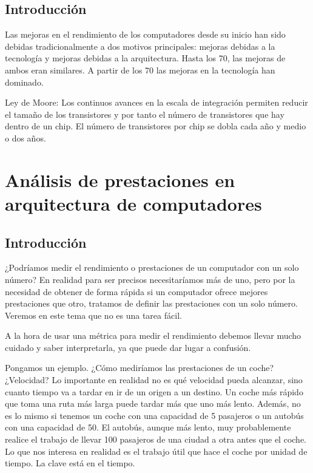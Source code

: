 \documentclass[12pt,onecolumn]{memoir}
\begin{document}
\section{Introducción}
\label{sec:introduccion_presentacion}

Las mejoras en el rendimiento de los computadores desde su inicio han
sido debidas tradicionalmente a dos motivos principales: mejoras
debidas a la tecnología y mejoras debidas a la arquitectura. Hasta los
70, las mejoras de ambos eran similares. A partir de los 70 las
mejoras en la tecnología han dominado.

Ley de Moore: Los continuos avances en la escala de integración
permiten reducir el tamaño de los transistores y por tanto el número
de transistores que hay dentro de un chip. El número de transistores
por chip se dobla cada año y medio o dos años.





\chapter{Análisis de prestaciones en arquitectura de computadores}
\label{cap:prestaciones}


\section{Introducción}
\label{sec:introduccion_prestaciones}

¿Podríamos medir el rendimiento o prestaciones de un computador con un
solo número? En realidad para ser precisos necesitaríamos más de uno,
pero por la necesidad de obtener de forma rápida si un computador
ofrece mejores prestaciones que otro, tratamos de definir las
prestaciones con un solo número. Veremos en este tema que no es una
tarea fácil.

A la hora de usar una métrica para medir el rendimiento debemos llevar
mucho cuidado y saber interpretarla, ya que puede dar lugar a
confusión.

Pongamos un ejemplo. ¿Cómo mediríamos las prestaciones de un coche?
¿Velocidad? Lo importante en realidad no es qué velocidad pueda
alcanzar, sino cuanto tiempo va a tardar en ir de un origen a un destino. Un
coche más rápido que toma una ruta más larga puede tardar más que uno
más lento. Además, no es lo mismo si tenemos un coche con una
capacidad de 5 pasajeros o un autobús con una capacidad de 50. El
autobús, aunque más lento, muy probablemente realice el trabajo de
llevar 100 pasajeros de una ciudad a otra antes que el coche.
Lo que nos interesa en realidad es el trabajo útil que hace el coche
por unidad de tiempo. La clave está en el tiempo.
\end{document}
